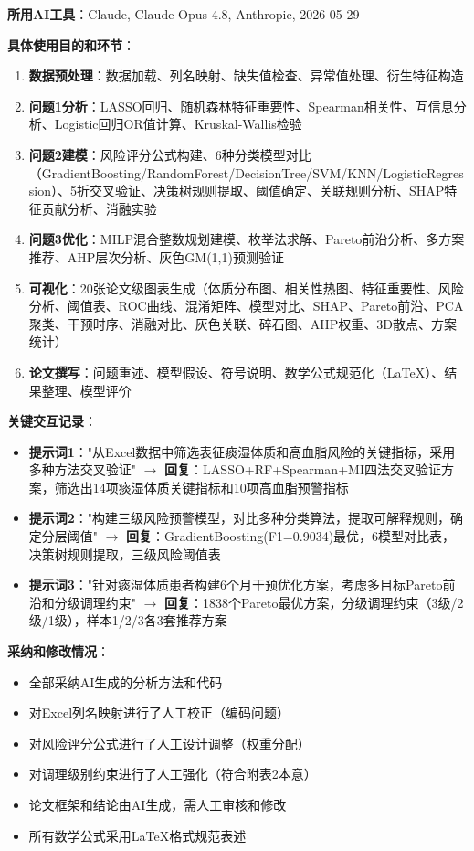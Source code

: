 \documentclass[12pt,a4paper]{ctexart}
\begin{document}
\textbf{所用AI工具}：Claude, Claude Opus 4.8, Anthropic, 2026-05-29

\textbf{具体使用目的和环节}：

\begin{enumerate}
    \item \textbf{数据预处理}：数据加载、列名映射、缺失值检查、异常值处理、衍生特征构造

    \item \textbf{问题1分析}：LASSO回归、随机森林特征重要性、Spearman相关性、互信息分析、Logistic回归OR值计算、Kruskal-Wallis检验

    \item \textbf{问题2建模}：风险评分公式构建、6种分类模型对比（GradientBoosting/RandomForest/DecisionTree/SVM/KNN/LogisticRegression）、5折交叉验证、决策树规则提取、阈值确定、关联规则分析、SHAP特征贡献分析、消融实验

    \item \textbf{问题3优化}：MILP混合整数规划建模、枚举法求解、Pareto前沿分析、多方案推荐、AHP层次分析、灰色GM(1,1)预测验证

    \item \textbf{可视化}：20张论文级图表生成（体质分布图、相关性热图、特征重要性、风险分析、阈值表、ROC曲线、混淆矩阵、模型对比、SHAP、Pareto前沿、PCA聚类、干预时序、消融对比、灰色关联、碎石图、AHP权重、3D散点、方案统计）

    \item \textbf{论文撰写}：问题重述、模型假设、符号说明、数学公式规范化（LaTeX）、结果整理、模型评价
\end{enumerate}

\textbf{关键交互记录}：

\begin{itemize}
    \item \textbf{提示词1}："从Excel数据中筛选表征痰湿体质和高血脂风险的关键指标，采用多种方法交叉验证" $\rightarrow$ \textbf{回复}：LASSO+RF+Spearman+MI四法交叉验证方案，筛选出14项痰湿体质关键指标和10项高血脂预警指标

    \item \textbf{提示词2}："构建三级风险预警模型，对比多种分类算法，提取可解释规则，确定分层阈值" $\rightarrow$ \textbf{回复}：GradientBoosting(F1=0.9034)最优，6模型对比表，决策树规则提取，三级风险阈值表

    \item \textbf{提示词3}："针对痰湿体质患者构建6个月干预优化方案，考虑多目标Pareto前沿和分级调理约束" $\rightarrow$ \textbf{回复}：1838个Pareto最优方案，分级调理约束（3级/2级/1级），样本1/2/3各3套推荐方案
\end{itemize}

\textbf{采纳和修改情况}：
\begin{itemize}
    \item 全部采纳AI生成的分析方法和代码
    \item 对Excel列名映射进行了人工校正（编码问题）
    \item 对风险评分公式进行了人工设计调整（权重分配）
    \item 对调理级别约束进行了人工强化（符合附表2本意）
    \item 论文框架和结论由AI生成，需人工审核和修改
    \item 所有数学公式采用LaTeX格式规范表述
\end{itemize}
\end{document}

